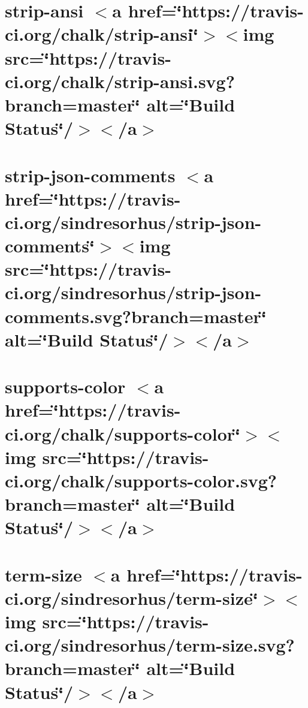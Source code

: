 \let\mypdfximage\pdfximage\def\pdfximage{\immediate\mypdfximage}\documentclass[twoside]{book}
\newcommand{\+}{\discretionary{\mbox{\scriptsize$\hookleftarrow$}}{}{}}
\begin{document}
\chapter{strip-\/ansi $<$a href=\char`\"{}https\+://travis-\/ci.\+org/chalk/strip-\/ansi\char`\"{}$>$$<$img src=\char`\"{}https\+://travis-\/ci.\+org/chalk/strip-\/ansi.\+svg?branch=master\char`\"{} alt=\char`\"{}\+Build Status\char`\"{}/$>$$<$/a$>$}
\label{md__c_1__git_hub__p_r_o_y_e_c_t_o-_i_i_i-_g_o_t_rest-api-node-mysql_node_modules_strip-ansi_readme}

\chapter{strip-\/json-\/comments $<$a href=\char`\"{}https\+://travis-\/ci.\+org/sindresorhus/strip-\/json-\/comments\char`\"{}$>$$<$img src=\char`\"{}https\+://travis-\/ci.\+org/sindresorhus/strip-\/json-\/comments.\+svg?branch=master\char`\"{} alt=\char`\"{}\+Build Status\char`\"{}/$>$$<$/a$>$}
\label{md__c_1__git_hub__p_r_o_y_e_c_t_o-_i_i_i-_g_o_t_rest-api-node-mysql_node_modules_strip-json-comments_readme}

\chapter{supports-\/color $<$a href=\char`\"{}https\+://travis-\/ci.\+org/chalk/supports-\/color\char`\"{}$>$$<$img src=\char`\"{}https\+://travis-\/ci.\+org/chalk/supports-\/color.\+svg?branch=master\char`\"{} alt=\char`\"{}\+Build Status\char`\"{}/$>$$<$/a$>$}
\label{md__c_1__git_hub__p_r_o_y_e_c_t_o-_i_i_i-_g_o_t_rest-api-node-mysql_node_modules_supports-color_readme}

\chapter{term-\/size $<$a href=\char`\"{}https\+://travis-\/ci.\+org/sindresorhus/term-\/size\char`\"{}$>$$<$img src=\char`\"{}https\+://travis-\/ci.\+org/sindresorhus/term-\/size.\+svg?branch=master\char`\"{} alt=\char`\"{}\+Build Status\char`\"{}/$>$$<$/a$>$}
\label{md__c_1__git_hub__p_r_o_y_e_c_t_o-_i_i_i-_g_o_t_rest-api-node-mysql_node_modules_term-size_readme}

\end{document}
